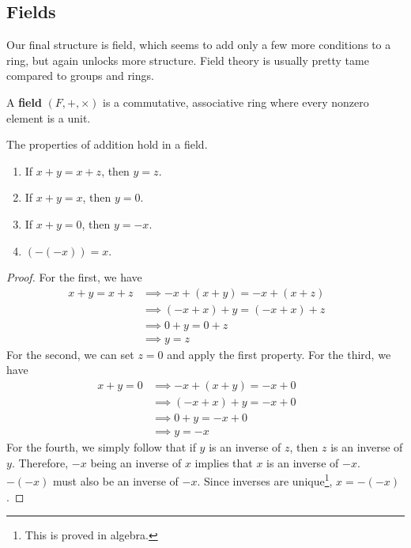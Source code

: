 \subsection{Fields}

  Our final structure is field, which seems to add only a few more conditions to a ring, but again unlocks more structure. Field theory is usually pretty tame compared to groups and rings. 

  \begin{definition}[Field]
    A \textbf{field} $(F, +, \times)$ is a commutative, associative ring where every nonzero element is a unit. 
  \end{definition}

  \begin{lemma}
    The properties of addition hold in a field. 
    \begin{enumerate}
      \item If $x + y = x + z$, then $y = z$. 
      \item If $x + y = x$, then $y = 0$. 
      \item If $x + y = 0$, then $y = -x$. 
      \item $(-(-x)) = x$. 
    \end{enumerate}
  \end{lemma}
  \begin{proof}
    For the first, we have 
    \begin{align}
      x + y = x + z & \implies -x + (x + y) = -x + (x + z) && \tag{addition is a function} \\
                    & \implies (-x + x) + y = (-x + x) + z && \tag{$+$ is associative} \\
                    & \implies 0 + y = 0 + z && \tag{definition of additive inverse} \\
                    & \implies y = z && \tag{definition of identity}
    \end{align} 
    For the second, we can set $z = 0$ and apply the first property. For the third, we have 
    \begin{align}
      x + y = 0 & \implies -x + (x + y) = -x + 0 && \tag{addition is a function} \\
                & \implies (-x + x) + y = -x + 0 && \tag{$+$ is associative} \\
                & \implies 0 + y = -x + 0 && \tag{definition of additive inverse} \\
                & \implies y = -x && \tag{definition of identity}
    \end{align}
    For the fourth, we simply follow that if $y$ is an inverse of $z$, then $z$ is an inverse of $y$. Therefore, $-x$ being an inverse of $x$ implies that $x$ is an inverse of $-x$. $-(-x)$ must also be an inverse of $-x$. Since inverses are unique\footnote{This is proved in algebra.}, $x = -(-x)$. 
  \end{proof}

